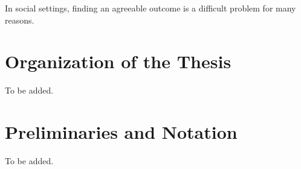 \label{intro:chapter}

In social settings, finding an agreeable outcome is a difficult problem for many reasons. 


\section{Organization of the Thesis}
To be added.


\section{Preliminaries and Notation}

To be added.

